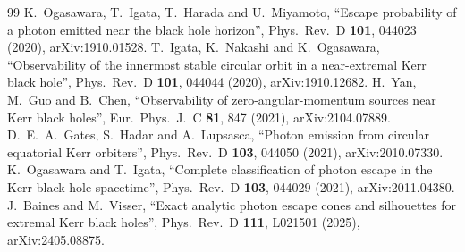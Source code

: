 \documentclass[11pt,a4paper]{article}
\theoremstyle{remark}
\numberwithin{equation}{section}
\begin{document}
\begin{thebibliography}{99}
 K.~Ogasawara, T.~Igata, T.~Harada and U.~Miyamoto, ``Escape probability of a photon emitted near the black hole horizon'', Phys.\ Rev.\ D \textbf{101}, 044023 (2020), arXiv:1910.01528.
 T.~Igata, K.~Nakashi and K.~Ogasawara, ``Observability of the innermost stable circular orbit in a near-extremal Kerr black hole'', Phys.\ Rev.\ D \textbf{101}, 044044 (2020), arXiv:1910.12682.
 H.~Yan, M.~Guo and B.~Chen, ``Observability of zero-angular-momentum sources near Kerr black holes'', Eur.\ Phys.\ J.\ C \textbf{81}, 847 (2021), arXiv:2104.07889.
 D.~E.~A.~Gates, S.~Hadar and A.~Lupsasca, ``Photon emission from circular equatorial Kerr orbiters'', Phys.\ Rev.\ D \textbf{103}, 044050 (2021), arXiv:2010.07330.
 K.~Ogasawara and T.~Igata, ``Complete classification of photon escape in the Kerr black hole spacetime'', Phys.\ Rev.\ D \textbf{103}, 044029 (2021), arXiv:2011.04380.
 J.~Baines and M.~Visser, ``Exact analytic photon escape cones and silhouettes for extremal Kerr black holes'', Phys.\ Rev.\ D \textbf{111}, L021501 (2025), arXiv:2405.08875.

\end{thebibliography}
\end{document}
